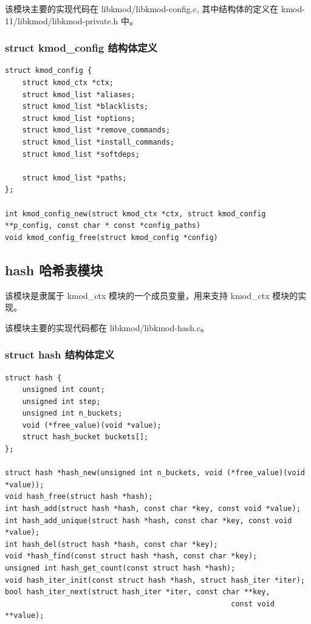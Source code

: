该模块主要的实现代码在 libkmod/libkmod-config.c, 其中结构体的定义在
kmod-11/libkmod/libkmod-private.h 中。

\subsubsection{struct kmod\_config 结构体定义}

{\begin{shaded}\begin{verbatim}
struct kmod_config {
    struct kmod_ctx *ctx;
    struct kmod_list *aliases;
    struct kmod_list *blacklists;
    struct kmod_list *options;
    struct kmod_list *remove_commands;
    struct kmod_list *install_commands;
    struct kmod_list *softdeps;

    struct kmod_list *paths;
};

int kmod_config_new(struct kmod_ctx *ctx, struct kmod_config **p_config, const char * const *config_paths)
void kmod_config_free(struct kmod_config *config)
\end{verbatim}\end{shaded}}
\subsection{hash 哈希表模块}

该模块是隶属于 kmod\_ctx 模块的一个成员变量，用来支持 kmod\_ctx
模块的实现。

该模块主要的实现代码都在 libkmod/libkmod-hash.c。

\subsubsection{struct hash 结构体定义}

{\begin{shaded}\begin{verbatim}
struct hash {
    unsigned int count;
    unsigned int step;
    unsigned int n_buckets;
    void (*free_value)(void *value);
    struct hash_bucket buckets[];
};

struct hash *hash_new(unsigned int n_buckets, void (*free_value)(void *value));
void hash_free(struct hash *hash);
int hash_add(struct hash *hash, const char *key, const void *value);
int hash_add_unique(struct hash *hash, const char *key, const void *value);
int hash_del(struct hash *hash, const char *key);
void *hash_find(const struct hash *hash, const char *key);
unsigned int hash_get_count(const struct hash *hash);
void hash_iter_init(const struct hash *hash, struct hash_iter *iter);
bool hash_iter_next(struct hash_iter *iter, const char **key,
                                                    const void **value);
\end{verbatim}\end{shaded}}

